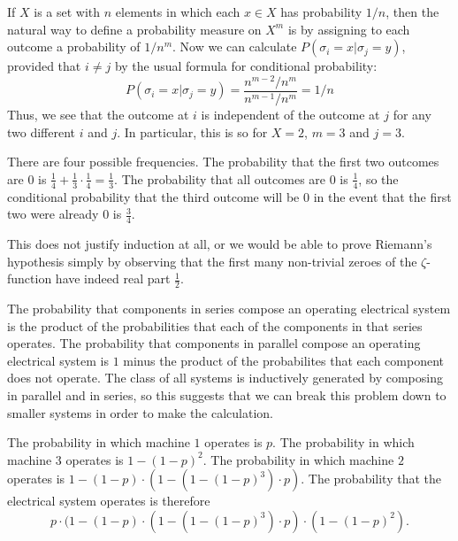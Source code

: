 \documentclass{article}
\begin{document}
\begin{ex}
If $X$ is a set with $n$ elements in which each $x\in X$ has probability $1/n$,
then the natural way to define a probability measure on $X^m$ is by assigning
to each outcome a probability of $1/n^m$. Now we can calculate 
$P(\sigma_i=x|\sigma_j=y)$, provided that $i\neq j$ by the usual formula for 
conditional probability:
\begin{equation*}
P(\sigma_i=x|\sigma_j=y)=\frac{n^{m-2}/n^m}{n^{m-1}/n^m}=1/n
\end{equation*}
Thus, we see that the outcome at $i$ is independent of the outcome at $j$ for
any two different $i$ and $j$. In particular, this is so for $X=2$, $m=3$ and $j=3$.

There are four possible frequencies. The probability that the first two outcomes
are $0$ is $\frac{1}{4}+\frac{1}{3}\cdot\frac{1}{4}=\frac{1}{3}$. The probability
that all outcomes are $0$ is $\frac{1}{4}$, so the conditional probability that
the third outcome will be $0$ in the event that the first two were already $0$
is $\frac{3}{4}$.

This does not justify induction at all, or we would be able to prove Riemann's
hypothesis simply by observing that the first many non-trivial zeroes of the
$\zeta$-function have indeed real part $\frac{1}{2}$. 
\end{ex}

\begin{ex}
The probability that components in series compose an operating electrical system is the product of the probabilities that each of the components in that series operates. The probability that components in parallel compose an operating electrical system is $1$ minus the product of the probabilites that each component does not operate. The class of all systems is inductively generated by composing in parallel and in series, so this suggests that we can break this problem down to smaller systems in order to make the calculation.

The probability in which machine $1$ operates is $p$. The probability in which machine $3$ operates is $1-(1-p)^2$. The probability in which machine $2$ operates is $1-(1-p)\cdot(1-(1-(1-p)^3)\cdot p)$. The probability that the electrical system operates is therefore
\begin{equation*}
p\cdot(1-(1-p)\cdot(1-(1-(1-p)^3)\cdot p)\cdot(1-(1-p)^2).
\end{equation*}
\end{ex}
\end{document}
